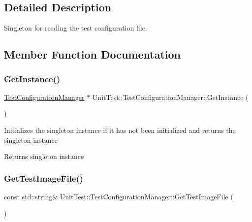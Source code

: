 \subsection{Detailed Description}
Singleton for reading the test configuration file. 

\subsection{Member Function Documentation}
\mbox{\label{class_unit_test_1_1_test_configuration_manager_a0d67d9b3fda9041d13927c6d2d42085b}} 
\subsubsection{\texorpdfstring{GetInstance()}{GetInstance()}}
{\footnotesize\ttfamily \mbox{\hyperlink{class_unit_test_1_1_test_configuration_manager}{Test\+Configuration\+Manager}} $\ast$ Unit\+Test\+::\+Test\+Configuration\+Manager\+::\+Get\+Instance (\begin{DoxyParamCaption}{ }\end{DoxyParamCaption})\hspace{0.3cm}{\ttfamily [static]}}

Initializes the singleton instance if it has not been initialized and returns the singleton instance \begin{DoxyReturn}{Returns}
singleton instance 
\end{DoxyReturn}
\mbox{\label{class_unit_test_1_1_test_configuration_manager_a68bc437de34df3e796fc6fde731c4803}} 
\subsubsection{\texorpdfstring{GetTestImageFile()}{GetTestImageFile()}}
{\footnotesize\ttfamily const std\+::string\& Unit\+Test\+::\+Test\+Configuration\+Manager\+::\+Get\+Test\+Image\+File (\begin{DoxyParamCaption}{ }\end{DoxyParamCaption})\hspace{0.3cm}{\ttfamily [inline]}}

